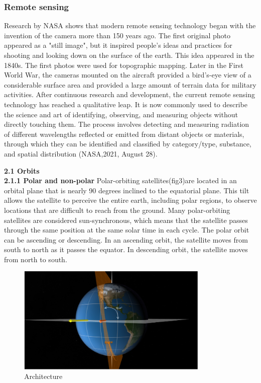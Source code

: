 \documentclass[conference]{IEEEtran}
\begin{document}
	\subsubsection{Remote sensing}
Research by NASA shows that modern remote sensing technology began with the invention of the camera more than 150 years ago. The first original photo appeared as a "still image", but it inspired people's ideas and practices for shooting and looking down on the surface of the earth. This idea appeared in the 1840s. The first photos were used for topographic mapping. Later in the First World War, the cameras mounted on the aircraft provided a bird's-eye view of a considerable surface area and provided a large amount of terrain data for military activities. After continuous research and development, the current remote sensing technology has reached a qualitative leap. It is now commonly used to describe the science and art of identifying, observing, and measuring objects without directly touching them. The process involves detecting and measuring radiation of different wavelengths reflected or emitted from distant objects or materials, through which they can be identified and classified by category/type, substance, and spatial distribution (NASA,2021, August 28).

\small 
{\bf 2.1 Orbits\rm} 
\\
{\bf 2.1.1 Polar and non-polar\rm}
Polar-orbiting satellites(fig3)are located in an orbital plane that is nearly 90 degrees inclined to the equatorial plane. This tilt allows the satellite to perceive the entire earth, including polar regions, to observe locations that are difficult to reach from the ground. Many polar-orbiting satellites are considered sun-synchronous, which means that the satellite passes through the same position at the same solar time in each cycle. The polar orbit can be ascending or descending. In an ascending orbit, the satellite moves from south to north as it passes the equator. In descending orbit, the satellite moves from north to south.

\usepackage{graphicx}

\begin{figure}[htbp]
	\centerline{\includegraphics[width=260pt]{images/1.1.1.png}}
	\caption{Architecture}
	\label{fig3}
\end{figure}
 
\end{document}
